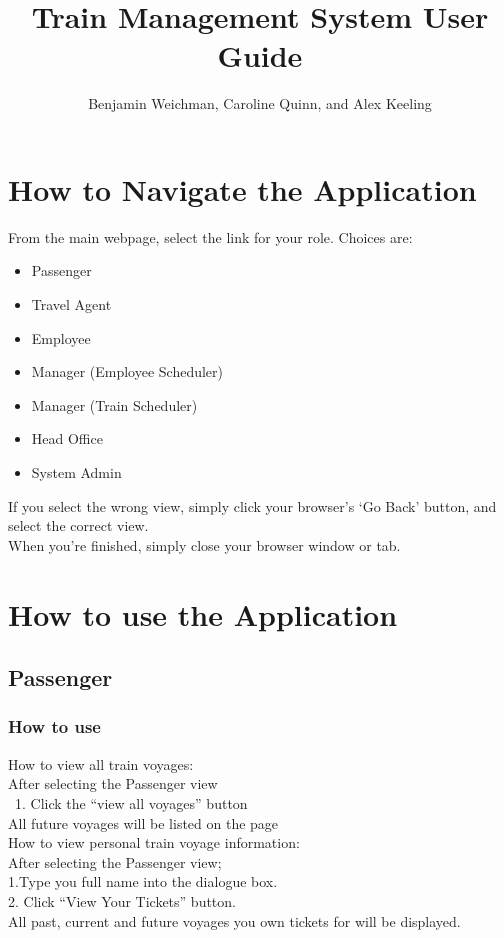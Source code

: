\documentclass[letter]{article}
\title{Train Management System User Guide}
\author{Benjamin Weichman, Caroline Quinn, and Alex Keeling}
\date{}
\begin{document}
\maketitle

\section{How to Navigate the Application}
From the main webpage, select the link for your role. Choices are: 
\begin{itemize}
\item Passenger
\item Travel Agent
\item Employee
\item Manager (Employee Scheduler)
\item Manager (Train Scheduler)
\item Head Office
\item System Admin
\end{itemize}

If you select the wrong view, simply click your browser's `Go Back' button, and select the correct view. \\

When you're finished, simply close your browser window or tab.


\section{How to use the Application}

\subsection{Passenger}
\subsubsection{How to use}

How to view all train voyages:\\ 
After selecting the Passenger view \\\
1. Click the “view all voyages” button\\
All future voyages will be listed on the page\\ 

How to view personal train voyage information:\\
After selecting the Passenger view;  \\
1.Type you full name into the dialogue box.\\
2. Click “View Your Tickets” button.\\
All past, current and future voyages you own tickets for will be displayed. 
\end{document}
